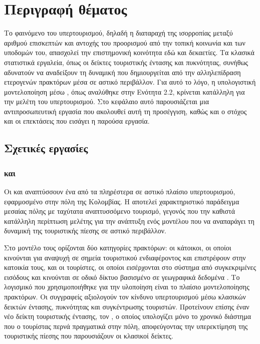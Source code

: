 \chapter{Περιγραφή θέματος}

Το φαινόμενο του υπερτουρισμού, δηλαδή η διαταραχή της
ισορροπίας μεταξύ αριθμού επισκεπτών και αντοχής του
προορισμού από την τοπική κοινωνία και των υποδομών του,
απασχολεί την επιστημονική κοινότητα εδώ και δεκαετίες.
Τα κλασικά στατιστικά εργαλεία, όπως οι δείκτες τουριστικής
έντασης και πυκνότητας, συνήθως αδυνατούν να αναδείξουν τη
δυναμική που δημιουργείται από την αλληλεπίδραση ετερογενών
πρακτόρων μέσα σε αστικό περιβάλλον. Για αυτό το λόγο, η
υπολογιστική μοντελοποίηση μέσω ,
όπως αναλύθηκε στην Ενότητα 2.2, κρίνεται κατάλληλη για την
μελέτη του υπερτουρισμού. Στο κεφάλαιο αυτό παρουσιάζεται μια
αντιπροσωπευτική εργασία που ακολουθεί αυτή τη προσέγγιση, καθώς
και ο στόχος και οι επεκτάσεις που εισάγει η παρούσα εργασία.

\section{Σχετικές εργασίες}

\subsection{ και }

Οι  και  \cite{moreno2025agent}
αναπτύσσουν ένα από τα πληρέστερα  σε αστικό πλαίσιο
υπερτουρισμού, εφαρμοσμένο στην πόλη  της Κολομβίας.
Η  αποτελεί χαρακτηριστικό παράδειγμα μεσαίας πόλης
με ταχύτατα αναπτυσσόμενο τουρισμό, γεγονός που την καθιστά κατάλληλη
περίπτωση μελέτης για την ανάπτυξη ενός μοντέλου  που να
αναπαράγει τη δυναμική της τουριστικής πίεσης σε αστικό περιβάλλον.

Στο μοντέλο τους ορίζονται δύο κατηγορίες πρακτόρων: οι κάτοικοι, οι
οποίοι κινούνται για αναψυχή σε σημεία τουριστικού ενδιαφέροντος
 και επιστρέφουν στην κατοικία τους, και οι τουρίστες, οι
οποίοι εισέρχονται στο σύστημα από συγκεκριμένες εισόδους και κινούνται
σε οδικό δίκτυο βασισμένο σε γεωγραφικά δεδομένα .
Το λογισμικό που χρησιμοποιήθηκε για την υλοποίηση είναι το 
πλαίσιο μοντελοποίησης πρακτόρων.
Οι συγγραφείς αξιολογούν τον κίνδυνο υπερτουρισμού μέσω κλασικών
δεικτών έντασης, πυκνότητας και συγκέντρωσης τουριστών. Προτείνουν
επίσης έναν νέο δείκτη τουριστικής έντασης, τον , ο οποίος υπολογίζει μόνο το χρονικό διάστημα
που ο τουρίστας περνά πραγματικά στην πόλη, αποφεύγοντας την
υπερεκτίμηση της τουριστικής πίεσης που παρουσιάζουν οι κλασικοί
δείκτες.

